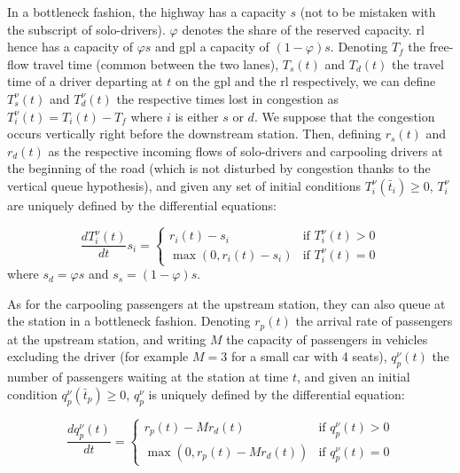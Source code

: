 \documentclass[english, a4paper]{article}
\theoremstyle{plain}
\theoremstyle{definition}
\theoremstyle{remark}
\begin{document}
In a bottleneck fashion, the highway has a capacity $s$ (not to be mistaken with the subscript of solo-drivers). $\varphi$ denotes the share of the reserved capacity. \acrshort{rl} hence has a capacity of $\varphi s$ and \acrshort{gpl} a capacity of $(1-\varphi)s$. Denoting $T_f$ the free-flow travel time (common between the two lanes), $T_s(t)$ and $T_d(t)$ the travel time of a driver departing at $t$ on the \acrshort{gpl} and the \acrshort{rl} respectively, we can define $T^{\nu}_s(t)$ and $T^{\nu}_d(t)$ the respective times lost in congestion as $T^{\nu}_i(t) = T_i(t) - T_f$ where $i$ is either $s$ or $d$. We suppose that the congestion occurs vertically right before the downstream station. Then, defining $r_s (t)$ and $r_d (t)$ as the respective incoming flows of solo-drivers and carpooling drivers at the beginning of the road (which is not disturbed by congestion thanks to the vertical queue hypothesis), and given any set of initial conditions $T^{\nu}_i(\bar{t}_i) \geq 0$, $T^{\nu}_i$ are uniquely defined by the differential equations:

\begin{equation}
    \frac{d T^{\nu}_i(t)}{dt} s_i = \left\{
    \begin{array}{lr}
        r_i (t) - s_i & \text{if } T^{\nu}_i(t) > 0\\
        \max (0, r_i (t) - s_i) & \text{if } T^{\nu}_i(t) = 0
    \end{array}
    \right.
\end{equation}
where $s_d = \varphi s$ and $s_s = (1-\varphi)s$.

As for the carpooling passengers at the upstream station, they can also queue at the station in a bottleneck fashion. Denoting $r_p(t)$ the arrival rate of passengers at the upstream station, and writing $M$ the capacity of passengers in vehicles excluding the driver (for example $M=3$ for a small car with 4 seats), $q^{\nu}_p(t)$ the number of passengers waiting at the station at time $t$, and given an initial condition $q^{\nu}_p(\bar{t}_p) \geq 0$, $q^{\nu}_p$ is uniquely defined by the differential equation:

\begin{equation}
    \frac{d q^{\nu}_p(t)}{dt} = \left\{
    \begin{array}{lr}
        r_p (t) - M r_d (t) & \text{if } q^{\nu}_p(t) > 0\\
        \max (0, r_p (t) - M r_d (t)) & \text{if } q^{\nu}_p(t) = 0
    \end{array}
    \right.
\end{equation}
\end{document}
